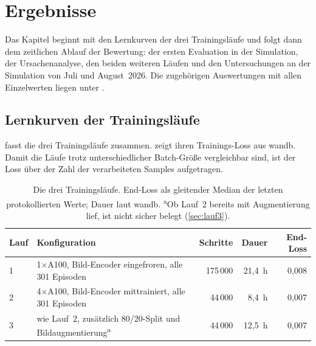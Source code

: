 
\chapter{Ergebnisse}
\label{chap:ergebnisse}

Das Kapitel beginnt mit den Lernkurven der drei Trainingsläufe und folgt dann
dem zeitlichen Ablauf der Bewertung: der ersten Evaluation in der Simulation,
der Ursachenanalyse, den beiden weiteren Läufen und den Untersuchungen an der
Simulation von Juli und August~2026. Die zugehörigen Auswertungen mit allen
Einzelwerten liegen unter .

\section{Lernkurven der Trainingsläufe}
\label{sec:trainingsverlauf}
\label{sec:lernkurven}

 fasst die drei Trainingsläufe zusammen.
 zeigt ihren Trainings-Loss aus \ac{wandb}. Damit die
Läufe trotz unterschiedlicher Batch-Größe vergleichbar sind, ist der Loss über
der Zahl der verarbeiteten Samples aufgetragen.

\begin{table}[htb]
  \centering
  \begin{tabularx}{\linewidth}{lXrrr}
    \toprule
    Lauf & Konfiguration & Schritte & Dauer & End-Loss \\
    \midrule
    1 & 1$\times$A100, Bild-Encoder eingefroren, alle 301 Episoden
      & 175\,000 & 21,4~h & 0,008 \\
    2 & 4$\times$A100, Bild-Encoder mittrainiert, alle 301 Episoden
      & 44\,000 & 8,4~h & 0,007 \\
    3 & wie Lauf~2, zusätzlich 80/20-Split und Bildaugmentierung\textsuperscript{a}
      & 44\,000 & 12,5~h & 0,007 \\
    \bottomrule
  \end{tabularx}
  \caption{Die drei Trainingsläufe. End-Loss als gleitender Median der letzten
    protokollierten Werte; Dauer laut \ac{wandb}. \textsuperscript{a}Ob Lauf~2 bereits mit Augmentierung lief, ist nicht
    sicher belegt (\cref{sec:lauf3}).}
  \label{tab:laeufe}
\end{table}

